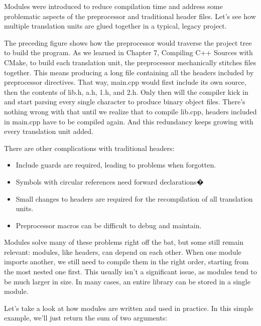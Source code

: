 Modules were introduced to reduce compilation time and address some problematic aspects of the preprocessor and traditional header files. Let’s see how multiple translation units are glued together in a typical, legacy project.


The preceding figure shows how the preprocessor would traverse the project tree to build the program. As we learned in Chapter 7, Compiling C++ Sources with CMake, to build each translation unit, the preprocessor mechanically stitches files together. This means producing a long file containing all the headers included by preprocessor directives. That way, main.cpp would first include its own source, then the contents of lib.h, a.h, 1.h, and 2.h. Only then will the compiler kick in and start parsing every single character to produce binary object files. There’s nothing wrong with that until we realize that to compile lib.cpp, headers included in main.cpp have to be compiled again. And this redundancy keeps growing with every translation unit added.

There are other complications with traditional headers:

\begin{itemize}
\item
Include guards are required, leading to problems when forgotten.

\item
Symbols with circular references need forward declarations�

\item
Small changes to headers are required for the recompilation of all translation units.

\item
Preprocessor macros can be difficult to debug and maintain.
\end{itemize}

Modules solve many of these problems right off the bat, but some still remain relevant: modules, like headers, can depend on each other. When one module imports another, we still need to compile them in the right order, starting from the most nested one first. This usually isn’t a significant issue, as modules tend to be much larger in size. In many cases, an entire library can be stored in a single module.

Let’s take a look at how modules are written and used in practice. In this simple example, we’ll just return the sum of two arguments:

